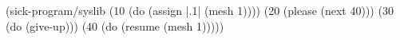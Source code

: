 \begin{CodeBlock}
(sick-program/syslib
 (10 (do (assign |.1| (mesh 1))))
 (20 (please (next 40)))
 (30 (do (give-up)))
 (40 (do (resume (mesh 1)))))

\end{CodeBlock}
